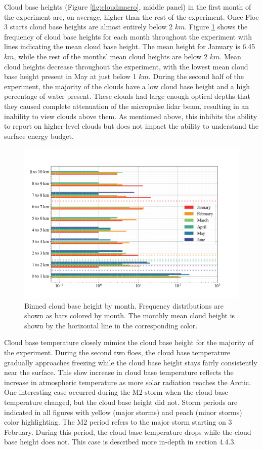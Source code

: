 Cloud base heights (Figure \ref{fig:cloudmacro}, middle panel) in the first month of the experiment are, on average, higher than the rest of the experiment. Once Floe 3 starts cloud base heights are almost entirely below 2 $km$. Figure \ref{fig:cloudbase} shows the frequency of cloud base heights for each month throughout the experiment with lines indicating the mean cloud base height. The mean height for January is 6.45 $km$, while the rest of the months' mean cloud heights are below 2 $km$. Mean cloud heights decrease throughout the experiment, with the lowest mean cloud base height present in May at just below 1 $km$. During the second half of the experiment, the majority of the clouds have a low cloud base height and a high percentage of water present. These clouds had large enough optical depths that they caused complete attenuation of the micropulse lidar beam, resulting in an inability to view clouds above them. As mentioned above, this inhibits the ability to report on higher-level clouds but does not impact the ability to understand the surface energy budget.

\begin{figure}[h]
    \centering
    \includegraphics[width=1\linewidth]{figures/chapter4/CloudHeights.png}
    \caption[Cloud base height by month histogram.]{Binned cloud base height by month. Frequency distributions are shown as bars colored by month. The monthly mean cloud height is shown by the horizontal line in the corresponding color.}
    \label{fig:cloudbase}
\end{figure}

Cloud base temperature closely mimics the cloud base height for the majority of the experiment. During the second two floes, the cloud base temperature gradually approaches freezing while the cloud base height stays fairly consistently near the surface. This slow increase in cloud base temperature reflects the increase in atmospheric temperature as more solar radiation reaches the Arctic. One interesting case occurred during the M2 storm when the cloud base temperature changed, but the cloud base height did not. Storm periods are indicated in all figures with yellow (major storms) and peach (minor storms) color highlighting. The M2 period refers to the major storm starting on 3 February. During this period, the cloud base temperature drops while the cloud base height does not. This case is described more in-depth in section 4.4.3.

